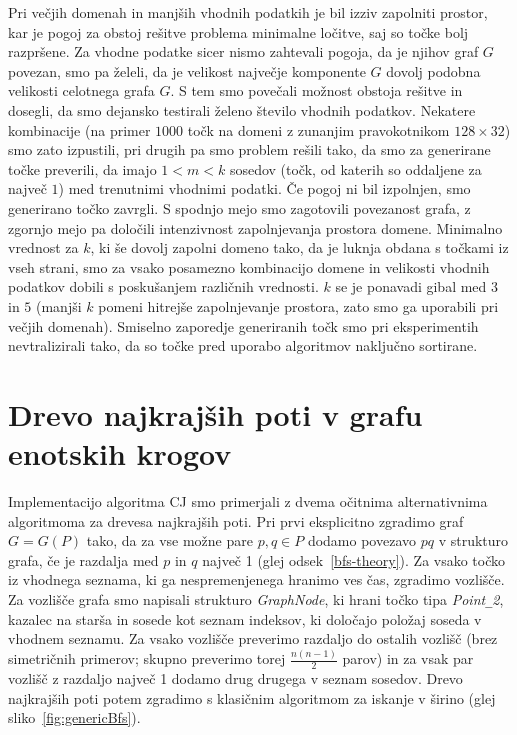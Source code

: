 \documentclass[a4paper, 12pt]{book}
\newcommand{\U}{\texttt{\_}}
\begin{document}
Pri večjih domenah in manjših vhodnih podatkih je bil izziv zapolniti prostor, kar je pogoj za obstoj rešitve problema minimalne ločitve, saj so točke bolj razpršene. Za vhodne podatke sicer nismo zahtevali pogoja, da je njihov graf $G$ povezan, smo pa želeli, da je velikost največje komponente $G$ dovolj podobna velikosti celotnega grafa $G$. S tem smo povečali možnost obstoja rešitve in dosegli, da smo dejansko testirali želeno število vhodnih podatkov. Nekatere kombinacije (na primer $1000$ točk na domeni z zunanjim pravokotnikom $128\times 32$) smo zato izpustili, pri drugih pa smo problem rešili tako, da smo za generirane točke preverili, da imajo $1 < m < k$ sosedov (točk, od katerih so oddaljene za največ $1$) med trenutnimi vhodnimi podatki. Če pogoj ni bil izpolnjen, smo generirano točko zavrgli. S spodnjo mejo smo zagotovili povezanost grafa, z zgornjo mejo pa določili intenzivnost zapolnjevanja prostora domene. Minimalno vrednost za $k$, ki še dovolj zapolni domeno tako, da je luknja obdana s točkami iz vseh strani, smo za vsako posamezno kombinacijo domene in velikosti vhodnih podatkov dobili s poskušanjem različnih vrednosti. $k$ se je ponavadi gibal med $3$ in $5$ (manjši $k$ pomeni hitrejše zapolnjevanje prostora, zato smo ga uporabili pri večjih domenah). Smiselno zaporedje generiranih točk smo pri eksperimentih nevtralizirali tako, da so točke pred uporabo algoritmov naključno sortirane.

\section{Drevo najkrajših poti v grafu enotskih krogov}
Implementacijo algoritma CJ smo primerjali z dvema očitnima alternativnima algoritmoma za drevesa najkrajših poti. Pri prvi eksplicitno zgradimo graf $G=G(P)$ tako, da za vse možne pare $p, q\in P$ dodamo povezavo $pq$ v strukturo grafa, če je razdalja med $p$ in $q$ največ 1 (glej odsek~\ref{bfs-theory}). Za vsako točko iz vhodnega seznama, ki ga nespremenjenega hranimo ves čas, zgradimo vozlišče. Za vozlišče grafa smo napisali strukturo \textit{GraphNode}, ki hrani točko tipa \textit{Point\U 2}, kazalec na starša in sosede kot seznam indeksov, ki določajo položaj soseda v vhodnem seznamu. Za vsako vozlišče preverimo razdaljo do ostalih vozlišč (brez simetričnih primerov; skupno preverimo torej $\frac{n(n-1)}{2}$ parov) in za vsak par vozlišč z razdaljo največ 1 dodamo drug drugega v seznam sosedov. Drevo najkrajših poti potem zgradimo s klasičnim algoritmom za iskanje v širino (glej sliko~\ref{fig:genericBfs}). 
\end{document}
